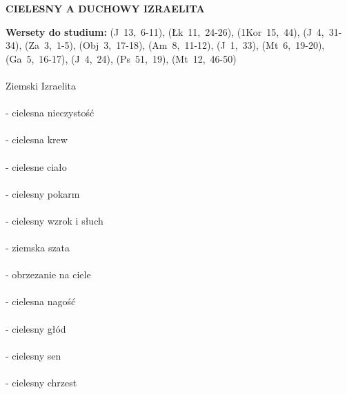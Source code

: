\documentclass[10pt,a4paper,oneside]{article}
\begin{document}
\centerline{\textbf{\MakeUppercase{Cielesny a duchowy Izraelita}}}
\begin{center}
\textbf{Wersety do studium:} 
\mbox{(J 13, 6-11)}, \mbox{(Łk 11, 24-26)}, \mbox{(1Kor 15, 44)}, \mbox{(J 4, 31-34)}, \mbox{(Za 3, 1-5)}, \mbox{(Obj 3, 17-18)}, \mbox{(Am 8, 11-12)}, \mbox{(J 1, 33)}, \mbox{(Mt 6, 19-20)}, \mbox{(Ga 5, 16-17)}, \mbox{(J 4, 24)}, \mbox{(Ps 51, 19)}, \mbox{(Mt 12, 46-50)}
\end{center}
\paragraph{}
Ziemski Izraelita
\paragraph{}
- cielesna nieczystość
\paragraph{}
- cielesna krew
\paragraph{}
- cielesne ciało
\paragraph{}
- cielesny pokarm
\paragraph{}
- cielesny wzrok i słuch
\paragraph{}
- ziemska szata
\paragraph{}
- obrzezanie na ciele
\paragraph{}
- cielesna nagość
\paragraph{}
- cielesny głód
\paragraph{}
- cielesny sen
\paragraph{}
- cielesny chrzest
\end{document}
